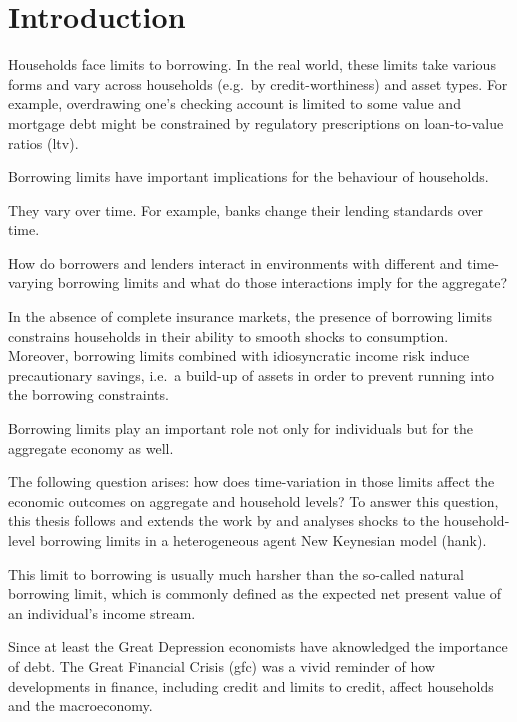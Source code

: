 \documentclass[12pt]{article}
\numberwithin{equation}{section} %
\begin{document}
\newpage
{} %
\pagestyle{fancy}
\fancyhf{}
\fancyhead[C]{\leftmark}
\fancyfoot[C]{\thepage}
\thispagestyle{plain}
\section{Introduction}
\label{sec:introduction}

Households face limits to borrowing. In the real world, these limits take various forms and vary across households (e.g.~by credit-worthiness) and asset types. For example, overdrawing one's checking account is limited to some value and mortgage debt might be constrained by regulatory prescriptions on loan-to-value ratios (\Gls{ltv}). 

Borrowing limits have important implications for the behaviour of households.

They vary over time. For example, banks change their lending standards over time.

How do borrowers and lenders interact in environments with different and time-varying borrowing limits and what do those interactions imply for the aggregate?

In the absence of complete insurance markets, the presence of borrowing limits constrains households in their ability to smooth shocks to consumption. Moreover, borrowing limits combined with idiosyncratic income risk induce precautionary savings, i.e.~a build-up of assets in order to prevent running into the borrowing constraints. 

Borrowing limits play an important role not only for individuals but for the aggregate economy as well.

The following question arises: how does time-variation in those limits affect the economic outcomes on aggregate and household levels? To answer this question, this thesis follows and extends the work by \textcite{gl2017} and analyses shocks to the household-level borrowing limits in a heterogeneous agent New Keynesian model (\Gls{hank}).

This limit to borrowing is usually much harsher than the so-called natural borrowing limit, which is commonly defined as the expected net present value of an individual's income stream. 

Since at least the Great Depression economists have aknowledged the importance of debt. The Great Financial Crisis (\Gls{gfc}) was a vivid reminder of how developments in finance, including credit and limits to credit, affect households and the macroeconomy. 
\end{document}
